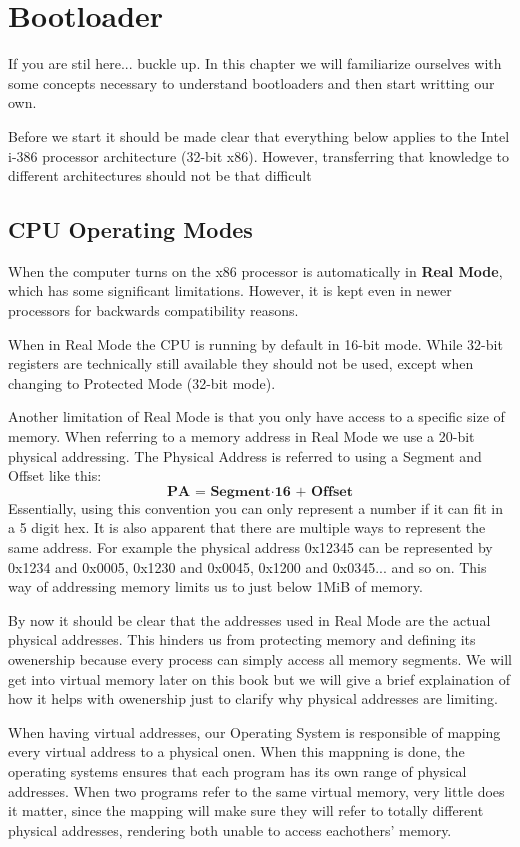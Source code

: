 \chapter{Bootloader}

If you are stil here... buckle up. In this chapter we will familiarize ourselves with some concepts necessary to understand bootloaders
and then start writting our own.

Before we start it should be made clear that everything below applies to the Intel i-386 processor architecture (32-bit x86).
However, transferring that knowledge to different architectures should not be that difficult

\section{CPU Operating Modes}

When the computer turns on the x86 processor is automatically in \textbf{Real Mode}, which has some significant limitations. However,
it is kept even in newer processors for backwards compatibility reasons. 

When in Real Mode the CPU is running by default in 16-bit mode. While 32-bit registers are technically still available they 
should not be used, except when changing to Protected Mode (32-bit mode).

Another limitation of Real Mode is that you only have access to a specific size of memory. When referring to a memory 
address in Real Mode we use a 20-bit physical addressing. The Physical Address is referred to using a Segment and Offset like this: 
\[
\textbf{PA = Segment} \cdot \textbf{16 + Offset}
\]
Essentially, using this convention you can only represent a number if it can fit in a 5 digit hex. It is also apparent that
there are multiple ways to represent the same address. For example the physical address 0x12345 can be represented 
by 0x1234 and 0x0005, 0x1230 and 0x0045, 0x1200 and 0x0345... and so on. This way of addressing memory limits us to just 
below 1MiB of memory.

By now it should be clear that the addresses used in Real Mode are the actual physical addresses. This hinders us from protecting
memory and defining its owenership because every process can simply access all memory segments. We will get into virtual memory 
later on this book but we will give a brief explaination of how it helps with owenership just to clarify why physical 
addresses are limiting.

When having virtual addresses, our Operating System is responsible of mapping every virtual address to a physical onen.
When this mappning is done, the operating systems ensures that each program has its own range of physical addresses.
When two programs refer to the same virtual memory, very little does it matter, since the mapping will make sure they 
will refer to totally different physical addresses, rendering both unable to access eachothers' memory.

